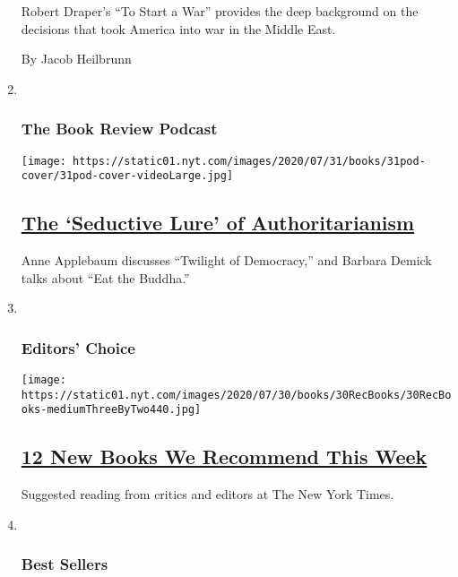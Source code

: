 \begin{enumerate}
  Robert Draper's ``To Start a War'' provides the deep background on the
  decisions that took America into war in the Middle East.

  By Jacob Heilbrunn
\item ~
  \hypertarget{the-book-review-podcast}{%
  \subsubsection{The Book Review
  Podcast}\label{the-book-review-podcast}}

  \texttt{[image: https://static01.nyt.com/images/2020/07/31/books/31pod-cover/31pod-cover-videoLarge.jpg]}

  \hypertarget{the-seductive-lure-of-authoritarianism}{%
  \subsection{\texorpdfstring{\href{/2020/07/31/books/review/podcast-twilight-democracy-anne-applebaum-eat-buddha-barbara-demick.html}{The
  `Seductive Lure' of
  Authoritarianism}}{The `Seductive Lure' of Authoritarianism}}\label{the-seductive-lure-of-authoritarianism}}

  Anne Applebaum discusses ``Twilight of Democracy,'' and Barbara Demick
  talks about ``Eat the Buddha.''
\item ~
  \hypertarget{editors-choice}{%
  \subsubsection{Editors' Choice}\label{editors-choice}}

  \texttt{[image: https://static01.nyt.com/images/2020/07/30/books/30RecBooks/30RecBooks-mediumThreeByTwo440.jpg]}

  \hypertarget{12-new-books-we-recommend-this-week}{%
  \subsection{\texorpdfstring{\href{/2020/07/30/books/review/12-new-books-we-recommend-this-week.html}{12
  New Books We Recommend This
  Week}}{12 New Books We Recommend This Week}}\label{12-new-books-we-recommend-this-week}}

  Suggested reading from critics and editors at The New York Times.
\item ~
  \hypertarget{best-sellers}{%
  \subsubsection{Best Sellers}\label{best-sellers}}


\end{enumerate}
